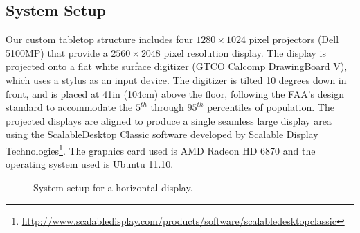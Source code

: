 \subsection{System Setup}
Our custom tabletop structure includes four $1280\times1024$ pixel projectors 
(Dell 5100MP) that provide a $2560\times2048$ pixel resolution display. The
display is projected onto a flat white surface digitizer (GTCO Calcomp DrawingBoard V), 
which uses a stylus as an input device. The digitizer is tilted 10 degrees down 
in front, and is placed at 41in (104cm) above the floor, following the FAA's
design standard to accommodate the $5^{th}$ through $95^{th}$ percentiles of 
population. The projected displays are aligned to produce a single 
seamless large display area using the ScalableDesktop Classic software developed
by Scalable Display Technologies\footnote{\url{http://www.scalabledisplay.com/products/software/scalabledesktopclassic}}.
The graphics card used is AMD Radeon HD 6870 and the operating system used is Ubuntu 11.10.

\begin{figure}[tbh]
  \centering
  \caption{System setup for a horizontal display.} 
  \label{fig:setup}
\end{figure}

